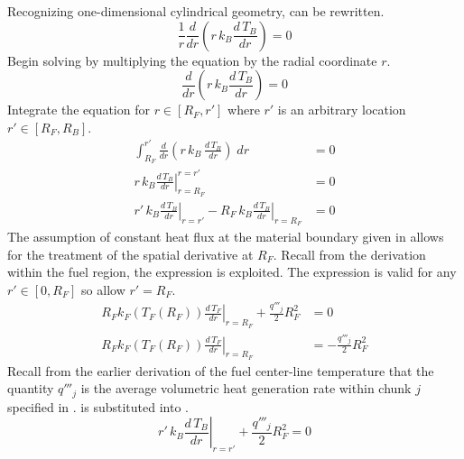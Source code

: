       Recognizing one-dimensional cylindrical geometry,  can 
      be rewritten.
      \begin{equation}
        \label{eq:tb_heat_conduction}
        \frac{1}{r} \frac{d}{dr} \left( r \, k_B \frac{d \, T_B}{dr} \right) = 0
      \end{equation}
      Begin solving  by multiplying the equation by
      the radial coordinate $r$.
      \begin{equation}
        \frac{d}{dr} \left( r \, k_B \frac{d \, T_B}{dr} \right) = 0
      \end{equation}
      Integrate the equation for $r \in[R_F,r']$ where $r'$ is an arbitrary
      location $r' \in [R_F,R_B]$.
      \begin{align}
        \int_{R_F}^{r'} \frac{d}{dr} \left( r\, k_B \, 
          \frac{d\,T_B}{dr} \right) \; dr &= 0\\
        \left. r\, k_B \frac{d\,T_B}{dr} \right|_{r=R_F}^{r=r'} &= 0 \\
        \label{eq:tf_first_integral}
        \left. r' \, k_B \frac{d\,T_B}{dr} \right|_{r=r'} - 
          \left. R_F \, k_B \frac{d\,T_B}{dr} \right|_{r=R_F} &= 0
      \end{align}
      The assumption of constant heat flux at the material boundary given in 
       allows for the treatment of the spatial 
      derivative at $R_F$. Recall from the derivation within the fuel region, 
      the expression  is exploited. The expression is valid 
      for any $r' \in [0,R_F]$ so allow $r'=R_F$.
      \begin{align}
        \left. R_F k_F(T_F(R_F)) \frac{d\,T_F}{dr} \right|_{r=R_F} + 
          \frac{q'''_j}{2} R_F^2 &= 0 \\
        \label{eq:surface_relation}
        \left. R_F k_F(T_F(R_F)) \frac{d\,T_F}{dr} \right|_{r=R_F} &= 
          - \frac{q'''_j}{2} R_F^2
      \end{align}
      Recall from the earlier derivation of the fuel center-line temperature 
      that the quantity $q'''_j$ is the average volumetric heat generation rate
      within chunk $j$ specified in .
       is substituted into
      .
      \begin{equation}
        \label{eq:tf_first_bc}
        \left. r' \, k_B \frac{d\,T_B}{dr} \right|_{r=r'} +
          \frac{q'''_j}{2} R_F^2 = 0
      \end{equation}
